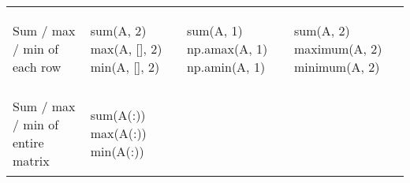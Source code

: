 \documentclass[10pt, landscape]{article}
\newenvironment{Shaded}{}{}
\newcommand{\DecValTok}[1]{\textcolor[rgb]{0.25,0.63,0.44}{{#1}}}
\newcommand{\FloatTok}[1]{\textcolor[rgb]{0.25,0.63,0.44}{{#1}}}
\newcommand{\BuiltInTok}[1]{{#1}}
\newcommand{\NormalTok}[1]{{#1}}
\begin{document}
\begin{multicols*}{2}
\begin{table}[ht]
\begin{tabular}[ ]{@{}llll@{}}
\begin{minipage}[t]{0.23\columnwidth}\raggedright\strut
Sum / max / min of each row\strut
\end{minipage} & \begin{minipage}[t]{0.22\columnwidth}\raggedright\strut
\begin{Shaded}
\begin{Highlighting}[]
\NormalTok{sum(A, }\FloatTok{2}\NormalTok{)}
\NormalTok{max(A, [], }\FloatTok{2}\NormalTok{)}
\NormalTok{min(A, [], }\FloatTok{2}\NormalTok{)}
\end{Highlighting}
\end{Shaded}
\strut
\end{minipage} & \begin{minipage}[t]{0.24\columnwidth}\raggedright\strut
\begin{Shaded}
\begin{Highlighting}[]
\BuiltInTok{sum}\NormalTok{(A, }\DecValTok{1}\NormalTok{)}
\NormalTok{np.amax(A, }\DecValTok{1}\NormalTok{)}
\NormalTok{np.amin(A, }\DecValTok{1}\NormalTok{)}
\end{Highlighting}
\end{Shaded}
\strut
\end{minipage} & \begin{minipage}[t]{0.20\columnwidth}\raggedright\strut
\begin{Shaded}
\begin{Highlighting}[]
\NormalTok{sum(A, }\FloatTok{2}\NormalTok{)}
\NormalTok{maximum(A, }\FloatTok{2}\NormalTok{)}
\NormalTok{minimum(A, }\FloatTok{2}\NormalTok{)}
\end{Highlighting}
\end{Shaded}
\strut
\end{minipage}\tabularnewline
\begin{minipage}[t]{0.23\columnwidth}\raggedright\strut
Sum / max / min of entire matrix\strut
\end{minipage} & \begin{minipage}[t]{0.22\columnwidth}\raggedright\strut
\begin{Shaded}
\begin{Highlighting}[]
\NormalTok{sum(A(:))}
\NormalTok{max(A(:))}
\NormalTok{min(A(:))}
\end{Highlighting}
\end{Shaded}
\strut
\end{minipage} & \begin{minipage}[t]{0.24\columnwidth}\raggedright\strut
\begin{Shaded}

\end{Shaded}
\end{minipage}
\end{tabular}
\end{table}
\end{multicols*}
\end{document}
